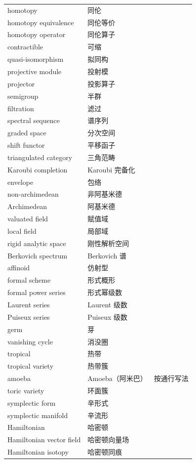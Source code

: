 \begin{longtable}{@{}p{}p{}p{}@{}}
homotopy & 同伦 &  \\
homotopy equivalence & 同伦等价 &  \\
homotopy operator & 同伦算子 &  \\
contractible & 可缩 &  \\
quasi-isomorphism & 拟同构 &  \\
projective module & 投射模 &  \\
projector & 投影算子 &  \\
semigroup & 半群 &  \\
filtration & 滤过 &  \\
spectral sequence & 谱序列 &  \\
graded space & 分次空间 &  \\
shift functor & 平移函子 &  \\
triangulated category & 三角范畴 &  \\
Karoubi completion & Karoubi 完备化 &  \\
envelope & 包络 &  \\
non-archimedean & 非阿基米德 &  \\
Archimedean & 阿基米德 &  \\
valuated field & 赋值域 &  \\
local field & 局部域 &  \\
rigid analytic space & 刚性解析空间 &  \\
Berkovich spectrum & Berkovich 谱 &  \\
affinoid & 仿射型 &  \\
formal scheme & 形式概形 &  \\
formal power series & 形式幂级数 &  \\
Laurent series & Laurent 级数 &  \\
Puiseux series & Puiseux 级数 &  \\
germ & 芽 &  \\
vanishing cycle & 消没圈 &  \\
tropical & 热带 &  \\
tropical variety & 热带簇 &  \\
amoeba & Amoeba（阿米巴） & 按通行写法 \\
toric variety & 环面簇 &  \\
symplectic form & 辛形式 &  \\
symplectic manifold & 辛流形 &  \\
Hamiltonian & 哈密顿 &  \\
Hamiltonian vector field & 哈密顿向量场 &  \\
Hamiltonian isotopy & 哈密顿同痕 &  \\

\end{longtable}
